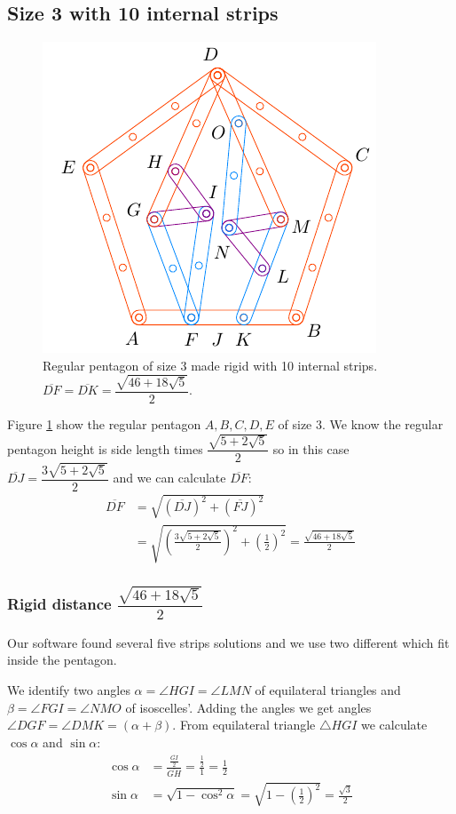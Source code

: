 \documentclass[11pt]{article}
\begin{document}
\subsection{Size 3 with 10 internal strips}

\begin{figure}[H]
\centering
\includegraphics[scale=1.2]{3/penta3-10a}
\caption{Regular pentagon of size 3 made rigid with 10 internal strips. $\overline{DF} = \overline{DK} = \dfrac{\sqrt{46+18\sqrt5}}2$.}
\label{fig:penta3-10a}
\end{figure}

Figure \ref{fig:penta3-10a} show the regular pentagon $A,B,C,D,E$ of size $3$. We know the regular pentagon height is side length times $\dfrac{\sqrt{5+2\sqrt5}}2$ so in this case $\overline{DJ} = \dfrac{3\sqrt{5+2\sqrt5}}2$ and we can calculate $\overline{DF}$:
\begin{align}
\overline{DF} &= \sqrt{(\overline{DJ})^2 + (\overline{FJ})^2}\nonumber\\
 &= \sqrt{\left(\frac{3\sqrt{5+2\sqrt5}}2\right)^2 + \left(\frac{1}2\right)^2}
 = \frac{\sqrt{46+18\sqrt5}}2
\end{align}

\subsubsection{Rigid distance $\dfrac{\sqrt{46+18\sqrt5}}2$}

Our software found several five strips solutions and we use two different which fit inside the pentagon.

We identify two angles $\alpha = \angle{HGI} = \angle{LMN}$ of equilateral triangles and $\beta = \angle{FGI} = \angle{NMO}$ of isoscelles'. Adding the angles we get angles $\angle{DGF} = \angle{DMK} = (\alpha + \beta)$. From equilateral triangle $\triangle{HGI}$ we calculate $\cos\alpha$ and $\sin\alpha$:
\begin{align}
\cos\alpha &= \frac{\frac{\overline{GI}}2}{\overline{GH}} = \frac{\frac{1}2}1 = \frac{1}2\\
\sin\alpha &= \sqrt{1 - \cos^2\alpha} = \sqrt{1 - \left(\frac{1}2\right)^2} = \frac{\sqrt3}2
\end{align}
\end{document}

